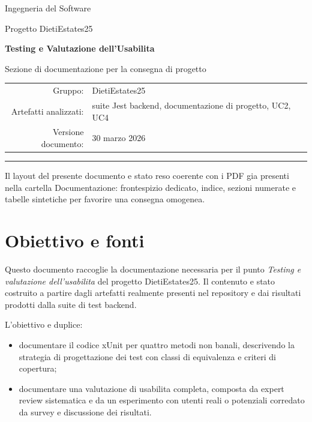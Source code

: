 \documentclass[a4paper,11pt]{article}
\begin{document}
\begin{titlepage}
  \centering
  \vspace*{2.5cm}
  {\Large Ingegneria del Software\par}
  \vspace{0.7cm}
  {\large Progetto DietiEstates25\par}
  \vspace{1.8cm}
  {\Huge\bfseries Testing e Valutazione dell'Usabilita\par}
  \vspace{1.2cm}
  {\Large Sezione di documentazione per la consegna di progetto\par}
  \vfill
  \begin{tabular}{rl}
    Gruppo: & DietiEstates25 \\
    Artefatti analizzati: & suite Jest backend, documentazione di progetto, UC2, UC4 \\
    Versione documento: & 30 marzo 2026
  \end{tabular}
  \vfill
  \rule{0.82\textwidth}{0.4pt}\par
  \vspace{0.3cm}
  {\small Il layout del presente documento e stato reso coerente con i PDF gia presenti nella cartella Documentazione: frontespizio dedicato, indice, sezioni numerate e tabelle sintetiche per favorire una consegna omogenea.\par}
\end{titlepage}

\tableofcontents
\clearpage
{}

\section{Obiettivo e fonti}
Questo documento raccoglie la documentazione necessaria per il punto \emph{Testing e valutazione dell'usabilita} del progetto DietiEstates25. Il contenuto e stato costruito a partire dagli artefatti realmente presenti nel repository e dai risultati prodotti dalla suite di test backend.

L'obiettivo e duplice:
\begin{itemize}
  \item documentare il codice xUnit per quattro metodi non banali, descrivendo la strategia di progettazione dei test con classi di equivalenza e criteri di copertura;
  \item documentare una valutazione di usabilita completa, composta da expert review sistematica e da un esperimento con utenti reali o potenziali corredato da survey e discussione dei risultati.
\end{itemize}
\end{document}
